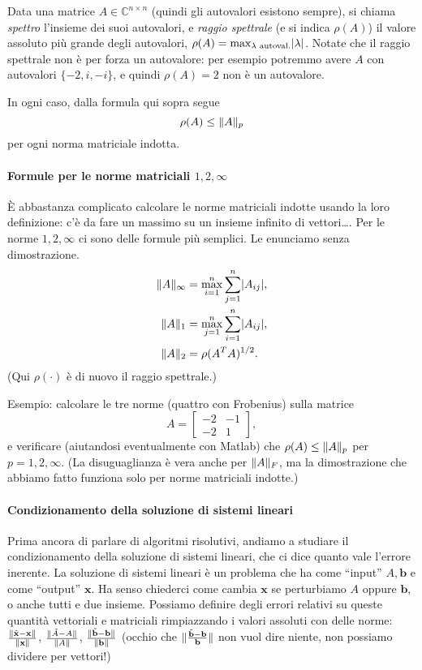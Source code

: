 \documentclass[a4paper]{report}
\DeclarePairedDelimiter{\abs}{\lvert}{\rvert}
\DeclarePairedDelimiter{\norm}{\lVert}{\rVert}
\theoremstyle{definiton}
\theoremstyle{remark}
\newcommand{\x}{\mathbf{x}}
\renewcommand{\b}{\mathbf{b}}
\begin{document}
Data una matrice $A \in \mathbb{C}^{n\times n}$ (quindi gli autovalori esistono sempre), si chiama \emph{spettro} l'insieme dei suoi autovalori, e \emph{raggio spettrale} (e si indica $\rho(A)$) il valore assoluto più grande degli autovalori, $\rho(A) = \max_{\lambda \text{ autoval.}} \abs{\lambda}$. Notate che il raggio spettrale non è per forza un autovalore: per esempio potremmo avere $A$ con autovalori $\{-2, i, -i\}$, e quindi $\rho(A)=2$ non è un autovalore.

In ogni caso, dalla formula qui sopra segue
\[
\rho(A) \leq \norm{A}_p
\]
per ogni norma matriciale indotta.

\paragraph{Formule per le norme matriciali $1,2,\infty$}
È abbastanza complicato calcolare le norme matriciali indotte usando la loro definizione: c'è da fare un massimo su un insieme infinito di vettori\dots. Per le norme $1,2,\infty$ ci sono delle formule più semplici. Le enunciamo senza dimostrazione.
\begin{align*}
\norm{A}_{\infty} &= \max_{i=1}^n \sum_{j=1}^n \abs{A_{ij}},\\
\norm{A}_{1} &= \max_{j=1}^n \sum_{i=1}^n \abs{A_{ij}},\\
\norm{A}_2 &= \rho(A^TA)^{1/2}.
\end{align*}
(Qui $\rho(\cdot)$ è di nuovo il raggio spettrale.)

Esempio: calcolare le tre norme (quattro con Frobenius) sulla matrice
\[
A = \begin{bmatrix}
    -2 & -1\\
    -2 & 1
\end{bmatrix},
\]
e verificare (aiutandosi eventualmente con Matlab) che $\rho(A)\leq \norm{A}_p$ per $p=1,2,\infty$. (La disuguaglianza è vera anche per $\norm{A}_F$, ma la dimostrazione che abbiamo fatto funziona solo per norme matriciali indotte.)

\paragraph{Condizionamento della soluzione di sistemi lineari} Prima ancora di parlare di algoritmi risolutivi, andiamo a studiare il condizionamento della soluzione di sistemi lineari, che ci dice quanto vale l'errore inerente. La soluzione di sistemi lineari è un problema che ha come ``input'' $A,\b$ e come ``output'' $\x$. Ha senso chiederci come cambia $\x$ se perturbiamo $A$ oppure $\b$, o anche tutti e due insieme. Possiamo definire degli errori relativi su queste quantità vettoriali e matriciali rimpiazzando i valori assoluti con delle norme: $\frac{\norm{\tilde{\x}-\x}}{\norm{\x}}$, $\frac{\norm{\tilde{A}-A}}{\norm{A}}$, $\frac{\norm{\tilde{\b}-\b}}{\norm{\b}}$ (occhio che $\norm{\frac{\tilde{\b}-\b}{\b}}$ non vuol dire niente, non possiamo dividere per vettori!)
\end{document}
